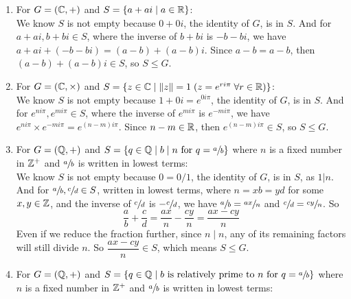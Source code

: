 \documentclass[12pt]{article}
\begin{document}
    \begin{enumerate}[label=\textbf{\alph*.}]
        \item 
            For $G = (\mathbb{C}, +)$ and $S = \{ a + ai \mid a \in \mathbb{R} \}$: \\
            We know $S$ is not empty because $0 + 0i$,
            the identity of $G$, is in $S$.
            And for $a + ai, b + bi \in S$,
            where the inverse of $b + bi$ is $-b -bi$,
            we have $a + ai + (-b -bi) = (a-b) + (a-b)i$.
            Since $a-b = a-b$,
            then $(a-b) + (a-b)i \in S$,
            so $S \leqslant G$.
        \item 
            For $G = (\mathbb{C}, \times)$ and $S = \{ z \in \mathbb{C} \mid \|z\| = 1
            \; (z = e^{ri\pi} \; \forall r \in \mathbb{R})\}$: \\
            We know $S$ is not empty because $1 + 0i = e^{0i\pi}$,
            the identity of $G$, is in $S$.
            And for $e^{ni\pi}, e^{mi\pi} \in S$,
            where the inverse of $e^{mi\pi}$ is $e^{-mi\pi}$,
            we have $e^{ni\pi} \times e^{-mi\pi} = e^{(n - m)i\pi}$.
            Since $n - m \in \mathbb{R}$,
            then $e^{(n - m)i\pi} \in S$,
            so $S \leqslant G$.
        \item 
            For $G = (\mathbb{Q}, +)$ and $S = \{ q \in \mathbb{Q} \mid b \mid n 
            \text{ for } q = \sfrac{a}{b} \}$
            where $n$ is a fixed number in $\mathbb{Z}^+$
            and $\sfrac{a}{b}$ is written in lowest terms: \\
            We know $S$ is not empty because $0 = 0/1$,
            the identity of $G$, is in $S$,
            as $1|n$.
            And for $\sfrac{a}{b}, \sfrac{c}{d} \in S$,
            written in lowest terms,
            where $n = xb = yd$ for some $x, y \in \mathbb{Z}$,
            and the inverse of $\sfrac{c}{d}$ is $-\sfrac{c}{d}$,
            we have $\sfrac{a}{b} = \sfrac{ax}{n}$
            and $\sfrac{c}{d} = \sfrac{cy}{n}$. 
            So \[\dfrac{a}{b} + \dfrac{c}{d} = 
            \dfrac{ax}{n} - \dfrac{cy}{n} = \dfrac{ax - cy}{n}\]
            Even if we reduce the fraction further, since $n \mid n$,
            any of its remaining factors will still divide $n$.
            So $\dfrac{ax - cy}{n} \in S$,
            which means $S \leqslant G$.
        \item 
            For $G = (\mathbb{Q}, +)$ and $S = \{ q \in \mathbb{Q} \mid b \text{ is
            relatively prime to $n$ for } q = \sfrac{a}{b} \}$
            where $n$ is a fixed number in $\mathbb{Z}^+$
            and $\sfrac{a}{b}$ is written in lowest terms: \\

\end{enumerate}
\end{document}
